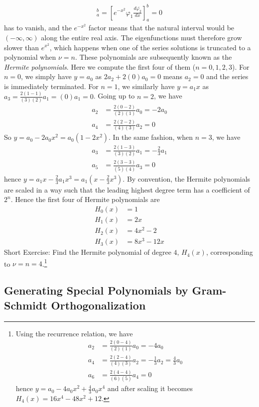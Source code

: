 \begin{solution}
\begin{align*}
[\varphi_1 p(x) \frac{d\overline{\varphi_2}}{dx}]_a^b = [e^{-x^2} \varphi_1 \frac{d\overline{\varphi_2}}{dx}]_a^b = 0
\end{align*}
has to vanish, and the $e^{-x^2}$ factor means that the natural interval would be $(-\infty, \infty)$ along the entire real axis. The eigenfunctions must therefore grow slower than $e^{x^2}$, which happens when one of the series solutions is truncated to a polynomial when $\nu = n$. These polynomials are subsequently known as the \textit{Hermite polynomials}. Here we compute the first four of them ($n=0,1,2,3$). For $n=0$, we simply have $y = a_0$ as $2a_2 + 2(0)a_0 = 0$ means $a_2 = 0$ and the series is immediately terminated. For $n=1$, we similarly have $y = a_1x$ as $a_3 = \frac{2(1-1)}{(3)(2)}a_1 = (0)a_1 = 0$. Going up to $n=2$, we have
\begin{align*}
a_2 &= \frac{2(0-2)}{(2)(1)}a_0 = -2a_0 \\
a_4 &= \frac{2(2-2)}{(4)(3)}a_2 = 0
\end{align*}
So $y = a_0 - 2a_0 x^2 = a_0(1-2x^2)$. In the same fashion, when $n=3$, we have
\begin{align*}
a_3 &= \frac{2(1-3)}{(3)(2)}a_1 = -\frac{2}{3}a_1 \\
a_5 &= \frac{2(3-3)}{(5)(4)}a_3 = 0
\end{align*}
hence $y = a_1x - \frac{2}{3}a_1x^3 = a_1(x-\frac{2}{3}x^3)$. By convention, the Hermite polynomials are scaled in a way such that the leading highest degree term has a coefficient of $2^n$. Hence the first four of Hermite polynomials are
\begin{align*}
H_0(x) &= 1 \\
H_1(x) &= 2x \\
H_2(x) &= 4x^2 - 2 \\
H_3(x) &= 8x^3 - 12x
\end{align*}
Short Exercise: Find the Hermite polynomial of degree $4$, $H_4(x)$, corresponding to $\nu = n = 4$.\footnote{Using the recurrence relation, we have
\begin{align*}
a_2 &= \frac{2(0-4)}{(2)(1)}a_0 = -4a_0 \\
a_4 &= \frac{2(2-4)}{(4)(3)}a_2 = -\frac{1}{3}a_2 = \frac{4}{3}a_0 \\
a_6 &= \frac{2(4-4)}{(6)(5)}a_4 = 0
\end{align*}
hence $y = a_0 - 4a_0x^2 + \frac{4}{3}a_0x^4$ and after scaling it becomes $H_4(x) = 16x^4 - 48x^2 + 12$.}
\end{solution}

\subsection{Generating Special Polynomials by Gram-Schmidt Orthogonalization}

